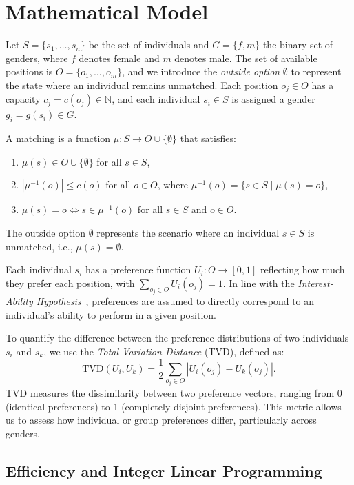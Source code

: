 \documentclass[letterpaper]{article}
\begin{document}
\section{Mathematical Model}

Let \( S = \{s_1, \ldots, s_n\} \) be the set of individuals and \( G = \{f, m\} \) the binary set of genders, where \( f \) denotes female and \( m \) denotes male. The set of available positions is \( O = \{o_1, \ldots, o_m\} \), and we introduce the \textit{outside option} \( \emptyset \) to represent the state where an individual remains unmatched. Each position \( o_j \in O \) has a capacity \( c_j = c(o_j) \in \mathbb{N} \), and each individual \( s_i \in S \) is assigned a gender \( g_i = g(s_i) \in G \).

A matching is a function \( \mu : S \to O \cup \{\emptyset\} \) that satisfies:
\begin{enumerate}
    \item \( \mu(s) \in O \cup \{\emptyset\} \) for all \( s \in S \),
    \item  \( |\mu^{-1}(o)| \leq c(o) \) for all \( o \in O \), where \( \mu^{-1}(o) = \{ s \in S \mid \mu(s) = o \} \),
    \item \( \mu(s) = o \iff s \in \mu^{-1}(o) \) for all \( s \in S \) and \( o \in O \).
\end{enumerate}

The outside option \( \emptyset \) represents the scenario where an individual \( s \in S \) is unmatched, i.e., \( \mu(s) = \emptyset \).

Each individual \( s_i \) has a preference function \( U_i : O \to [0, 1] \) reflecting how much they prefer each position, with \( \sum_{o_j \in O} U_i(o_j) = 1 \). In line with the \textit{Interest-Ability Hypothesis}~\cite{jintelligence10030043}, preferences are assumed to directly correspond to an individual's ability to perform in a given position.

To quantify the difference between the preference distributions of two individuals \( s_i \) and \( s_k \), we use the \textit{Total Variation Distance} (TVD), defined as:
\[
\text{TVD}(U_i, U_k) = \frac{1}{2} \sum_{o_j \in O} \left| U_i(o_j) - U_k(o_j) \right|.
\]
TVD measures the dissimilarity between two preference vectors, ranging from 0 (identical preferences) to 1 (completely disjoint preferences). This metric allows us to assess how individual or group preferences differ, particularly across genders.

\subsection*{Efficiency and Integer Linear Programming}
\end{document}
